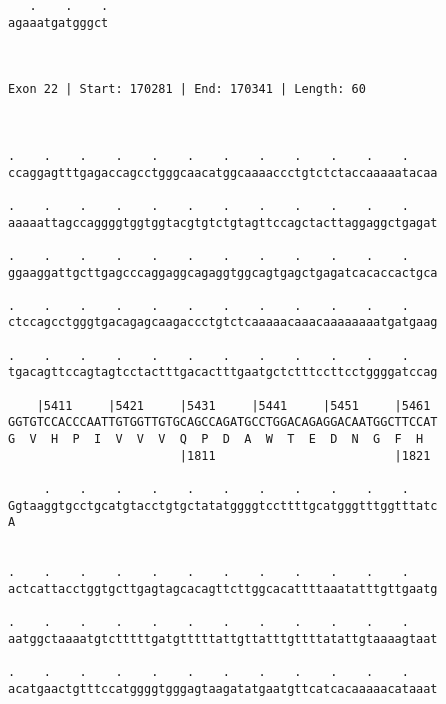 \documentclass{article}
\begin{document}
\begin{Verbatim}
   .    .    .
agaaatgatgggct
              
              
 
Exon 22 | Start: 170281 | End: 170341 | Length: 60



.    .    .    .    .    .    .    .    .    .    .    .    
ccaggagtttgagaccagcctgggcaacatggcaaaaccctgtctctaccaaaaatacaa
                                                            
.    .    .    .    .    .    .    .    .    .    .    .    
aaaaattagccaggggtggtggtacgtgtctgtagttccagctacttaggaggctgagat
                                                            
.    .    .    .    .    .    .    .    .    .    .    .    
ggaaggattgcttgagcccaggaggcagaggtggcagtgagctgagatcacaccactgca
                                                            
.    .    .    .    .    .    .    .    .    .    .    .    
ctccagcctgggtgacagagcaagaccctgtctcaaaaacaaacaaaaaaaatgatgaag
                                                            
.    .    .    .    .    .    .    .    .    .    .    .    
tgacagttccagtagtcctactttgacactttgaatgctctttccttcctggggatccag
                                                            
    |5411     |5421     |5431     |5441     |5451     |5461 
GGTGTCCACCCAATTGTGGTTGTGCAGCCAGATGCCTGGACAGAGGACAATGGCTTCCAT
G  V  H  P  I  V  V  V  Q  P  D  A  W  T  E  D  N  G  F  H  
                        |1811                         |1821 
  
     .    .    .    .    .    .    .    .    .    .    .    
Ggtaaggtgcctgcatgtacctgtgctatatggggtccttttgcatgggtttggtttatc
A                                                           
                                                            
  
.    .    .    .    .    .    .    .    .    .    .    .    
actcattacctggtgcttgagtagcacagttcttggcacattttaaatatttgttgaatg
                                                            
.    .    .    .    .    .    .    .    .    .    .    .    
aatggctaaaatgtctttttgatgtttttattgttatttgttttatattgtaaaagtaat
                                                            
.    .    .    .    .    .    .    .    .    .    .    .    
acatgaactgtttccatggggtgggagtaagatatgaatgttcatcacaaaaacataaat
                                                            

\end{Verbatim}
\end{document}

